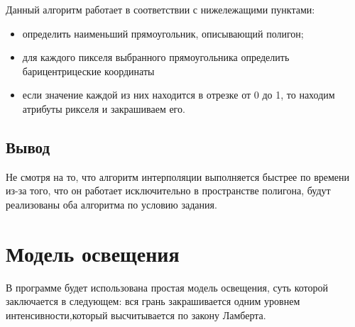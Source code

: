 Данный алгоритм работает в соответствии с нижележащими пунктами:
\begin{itemize}
	\item определить наименьший прямоугольник, описывающий полигон;
	\item для каждого пикселя выбранного прямоугольника определить барицентрицеские координаты
	\item если значение каждой из них находится в отрезке от 0 до 1, то находим атрибуты рикселя и закрашиваем его.
\end{itemize}

\subsection*{Вывод}
Не смотря на то, что алгоритм интерполяции выполняется быстрее по времени из-за того, что он работает исключительно в пространстве полигона, будут реализованы оба алгоритма по условию задания.

\section{Модель освещения}
В программе будет использована простая модель освещения, суть которой заключается в следующем: вся грань закрашивается одним уровнем интенсивности,который высчитывается по закону Ламберта. 
